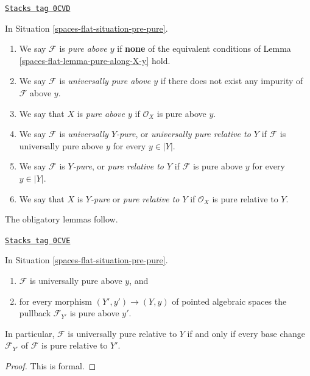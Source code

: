 \begin{definition}[Pure]
\label{spaces-flat-definition-pure}
\href{https://stacks.math.columbia.edu/tag/0CVD}{\texttt{Stacks tag 0CVD}}

In Situation \ref{spaces-flat-situation-pre-pure}.
\begin{enumerate}
\item We say $\mathcal{F}$ is {\it pure above $y$} if {\bf none} of the
equivalent conditions of Lemma \ref{spaces-flat-lemma-pure-along-X-y} hold.
\item We say $\mathcal{F}$ is {\it universally pure above $y$}
if there does not exist any impurity of $\mathcal{F}$ above $y$.
\item We say that $X$ is {\it pure above $y$} if $\mathcal{O}_X$
is pure above $y$.
\item We say $\mathcal{F}$ is {\it universally $Y$-pure}, or
{\it universally pure relative to $Y$} if $\mathcal{F}$ is universally
pure above $y$ for every $y \in |Y|$.
\item We say $\mathcal{F}$ is {\it $Y$-pure}, or
{\it pure relative to $Y$} if $\mathcal{F}$ is pure above $y$
for every $y \in |Y|$.
\item We say that $X$ is {\it $Y$-pure} or {\it pure relative to $Y$}
if $\mathcal{O}_X$ is pure relative to $Y$.
\end{enumerate}
\end{definition}

The obligatory lemmas follow.

\begin{lemma}
\label{spaces-flat-lemma-base-change-universally}
\href{https://stacks.math.columbia.edu/tag/0CVE}{\texttt{Stacks tag 0CVE}}

In Situation \ref{spaces-flat-situation-pre-pure}.
\begin{enumerate}
\item $\mathcal{F}$ is universally pure above $y$, and
\item for every morphism $(Y', y') \to (Y, y)$ of pointed algebraic spaces
the pullback $\mathcal{F}_{Y'}$ is pure above $y'$.
\end{enumerate}
In particular, $\mathcal{F}$ is universally pure relative to $Y$ if and
only if every base change $\mathcal{F}_{Y'}$ of $\mathcal{F}$ is
pure relative to $Y'$.
\end{lemma}

\begin{proof}
This is formal.
\end{proof}

